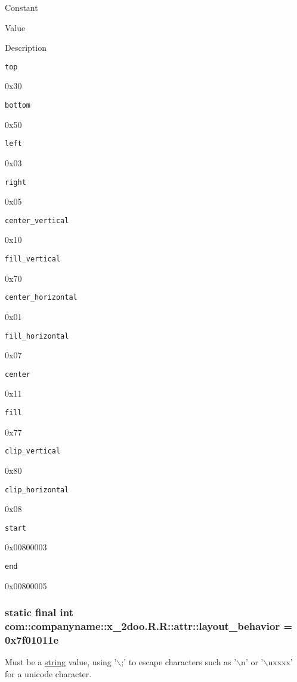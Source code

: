 Constant

Value

Description 

{\tt top}

0x30

{\tt bottom}

0x50

{\tt left}

0x03

{\tt right}

0x05

{\tt center\_\-vertical}

0x10

{\tt fill\_\-vertical}

0x70

{\tt center\_\-horizontal}

0x01

{\tt fill\_\-horizontal}

0x07

{\tt center}

0x11

{\tt fill}

0x77

{\tt clip\_\-vertical}

0x80

{\tt clip\_\-horizontal}

0x08

{\tt start}

0x00800003

{\tt end}

0x00800005\hypertarget{classcom_1_1companyname_1_1x__2doo_1_1_r_1_1attr_97e21f24c9d00877e459e35733cf4c20}{
\subsubsection[{layout\_\-behavior}]{\setlength{\rightskip}{0pt plus 5cm}static final int com::companyname::x\_\-2doo.R.R::attr::layout\_\-behavior = 0x7f01011e}}
\label{classcom_1_1companyname_1_1x__2doo_1_1_r_1_1attr_97e21f24c9d00877e459e35733cf4c20}


Must be a \hyperlink{classcom_1_1companyname_1_1x__2doo_1_1_r_1_1string}{string} value, using '$\backslash$;' to escape characters such as '$\backslash$n' or '$\backslash$uxxxx' for a unicode character. 

